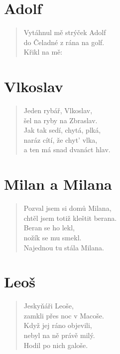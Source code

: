 \section*{Adolf}
\begin{verse}
Vytáhnul mě strýček Adolf\\
do Čeladné z rána na golf.\\
Křikl na mě: 
\end{verse}

\section*{Vlkoslav}
\begin{verse}
Jeden rybář, Vlkoslav,\\
šel na ryby na Zbraslav.\\
Jak tak sedí, chytá, plká,\\
naráz cítí, že chyt' vlka,\\
a ten má snad dvanáct hlav.
\end{verse}

\section*{Milan a Milana}
\begin{verse}
Pozval jsem si domů Milana,\\
chtěl jsem totiž kleštit berana.\\
Beran se ho lekl,\\
nožík se mu smekl.\\
Najednou tu stála Milana.
\end{verse}

\section*{Leoš}
\begin{verse}
Jeskyňáři Leoše,\\
zamkli přes noc v Macoše.\\
Když jej ráno objevili,\\
nebyl na ně právě milý.\\
Hodil po nich galoše.
\end{verse}

